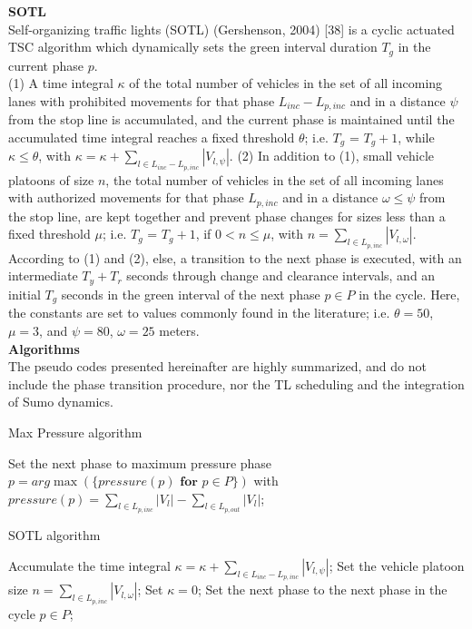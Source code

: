 \textbf{SOTL}\\
Self-organizing traffic lights (SOTL) (Gershenson, 2004) [38] is a cyclic actuated TSC algorithm which dynamically sets the green interval duration $T_g$ in the current phase $p$. \\
(1) A time integral $\kappa$ of the total number of vehicles in the set of all incoming lanes with prohibited movements for that phase $L_{inc} - L_{p,inc}$ and in a distance $\psi$ from the stop line is accumulated, and the current phase is maintained until the accumulated time integral reaches a fixed threshold $\theta$; i.e. $T_g$ = $T_g+1$, while $\kappa \le \theta$, with $\kappa = \kappa + \sum_{l \in L_{inc} - L_{p,inc}} |V_{l,\psi}|$.
(2) In addition to (1), small vehicle platoons of size $n$, the total number of vehicles in the set of all incoming lanes with authorized movements for that phase $L_{p,inc}$ and in a distance $\omega \le \psi$ from the stop line, are kept together and prevent phase changes for sizes less than a fixed threshold $\mu$; i.e. $T_g$ = $T_g+1$, if $0 < n \le \mu$, with $n = \sum_{l \in L_{p,inc}} |V_{l,\omega}|$.
According to (1) and (2), else, a transition to the next phase is executed, with an intermediate $T_y + T_r$ seconds through change and clearance intervals, and an initial $T_g$ seconds in the green interval of the next phase $p \in P$ in the cycle. Here, the constants are set to values commonly found in the literature; i.e. $\theta = 50$, $\mu = 3$, and $\psi = 80$, $\omega = 25$ meters. \\

\textbf{Algorithms}\\
The pseudo codes presented hereinafter are highly summarized, and do not include the phase transition procedure, nor the TL scheduling and the integration of Sumo dynamics. \\

\begin{algorithm}[H]
\small
\caption*{Max Pressure algorithm}
\begin{algorithmic}
        \STATE Set the next phase to maximum pressure phase $p = arg\max(\{pressure(p) \textbf{ for } p \in P\})$
        \STATE with $pressure(p) = \sum_{l \in L_{p,inc}} |V_l| - \sum_{l \in L_{p,out}} |V_l|$;
    \ENDIF
\end{algorithmic}
\end{algorithm}

\begin{algorithm}[H]
\small
\caption*{SOTL algorithm}
\begin{algorithmic}
    \STATE Accumulate the time integral $\kappa = \kappa + \sum_{l \in L_{inc} - L_{p,inc}} |V_{l,\psi}|$;
        \STATE Set the vehicle platoon size $n = \sum_{l \in L_{p,inc}} |V_{l,\omega}|$;
            \STATE Set $\kappa = 0$;
            \STATE Set the next phase to the next phase in the cycle $p \in P$;
        \ENDIF
    \ENDIF
\end{algorithmic}
\end{algorithm}

\pagebreak

